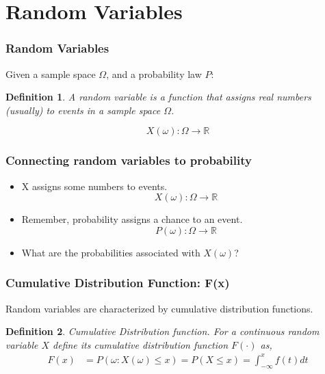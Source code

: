 \documentclass[aspectratio=169, handout]{beamer}
\newtheorem{defn}{Definition}
\numberwithin{equation}{section}
\begin{document}
\section{Random Variables}

\begin{frame}
\frametitle{Random Variables}
Given a sample space $\Omega$, and a probability law $P$:
\begin{defn}
A \emph{random variable} is a \alert{function} that assigns real numbers (usually) to events in a sample space $\Omega$.
\end{defn}
$$X(\omega): \Omega \to \mathbb{R}$$

\end{frame}


\begin{frame}
\frametitle{Connecting random variables to probability}
\begin{itemize}
\item X assigns some numbers to events.\pause
$$X(\omega): \Omega \to \mathbb{R}$$
\item Remember, probability assigns a chance to an event.\pause
$$P(\omega): \Omega \to \mathbb{R}$$
\item What are the probabilities associated with $X(\omega)$?\pause
\end{itemize}
\end{frame}





\begin{frame}
\frametitle{Cumulative Distribution Function: F(x)} 

Random variables are characterized by cumulative distribution functions.\pause

\begin{defn} 
Cumulative Distribution function.  For a continuous random variable $X$ define its cumulative distribution function $F(\cdot )$ as, 
\begin{align*} 
F(x) &=P(\omega: X(\omega)\leq x)= P(X \leq x) = \int_{-\infty} ^{x} f(t) dt 
\end{align*}
\end{defn}
\end{frame}
\end{document}
